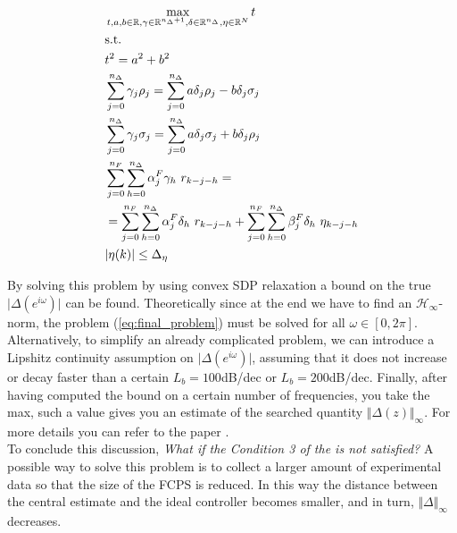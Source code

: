 \begin{equation}\label{eq:final_problem}
    \begin{aligned}
        &\max_{t,a,b\in\mathbb{R}, \gamma\in\mathbb{R}^{n_\Delta+1}, 
    \delta\in\mathbb{R}^{n_\Delta}, \eta\in\mathbb{R}^N} {t}\\
    &\text{s.t.}\\
    &t^2=a^2+b^2\\
    &\sum_{j=0}^{n_\Delta} {\color{black}\gamma_j} \rho_j= \sum_{j=0}^{n_\Delta}{
        {\color{black}a\delta_j} \rho_j  -  {\color{black}b\delta_j} \sigma_j 
   }\\
   &\sum_{j=0}^{n_\Delta} {\color{black}\gamma_j} \sigma_j= \sum_{j=0}^{n_\Delta}{
       {\color{black}a \delta_j} \sigma_j  + {\color{black}b \delta_j} \rho_j 
   }\\
   &\sum_{j=0}^{n_F} \sum_{h=0}^{n_\Delta} {\alpha_j^F {\color{black}\gamma_h} \ r_{k-j-h}} =\\
        &=\sum_{j=0}^{n_F} \sum_{h=0}^{n_\Delta}{\alpha_j^F {\color{black}\delta_h} \ r_{k-j-h}} +
        \sum_{j=0}^{n_F} \sum_{h=0}^{n_\Delta}{\beta_j^F {\color{black}\delta_h} \ \eta_{k-j-h}}\\
    &\vert \eta(k) \vert \le \Delta_\eta
    \end{aligned}
\end{equation}

By solving this problem by using convex SDP relaxation a bound on the true $\vert\Delta(e^{i\omega})\vert$ can be found. Theoretically since at the end we have to find an $\mathcal{H}_\infty$-norm, the problem (\ref{eq:final_problem}) must be solved for all $\omega\in[0,2\pi]$. Alternatively, to simplify an already complicated problem, we can introduce a Lipshitz continuity assumption on $\vert \Delta(e^{i\omega})\vert$, assuming that it does not increase or decay faster than a certain $L_b=100$dB/dec or $L_b=200$dB/dec. Finally, after having computed the bound on a certain number of frequencies, you take the max, such a value gives you an estimate of the searched quantity $\Vert \Delta(z) \Vert_\infty$. For more details you can refer to the paper \cite{abuabiah2023non}.\\

\noindent
To conclude this discussion, \textit{What if the Condition 3 of the  is not satisfied?} A possible way to solve this problem is to collect a larger amount of experimental data so that the size of the FCPS is reduced. In this way the distance between the central estimate and the ideal controller becomes smaller, and in turn, $\Vert \Delta \Vert_\infty$ decreases.


